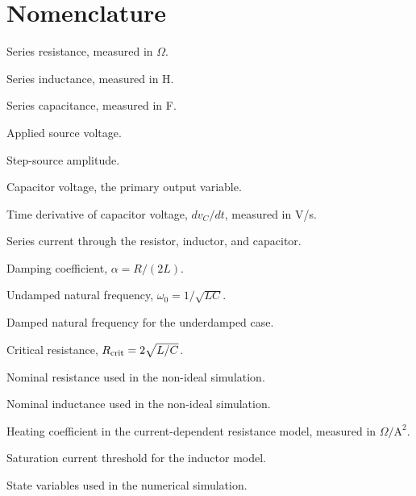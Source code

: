 \section*{Nomenclature}
\begin{IEEEdescription}[\IEEEusemathlabelsep\IEEEsetlabelwidth{$\Rcrit$}]
  \item[$R$] Series resistance, measured in $\Omega$.
  \item[$L$] Series inductance, measured in H.
  \item[$C$] Series capacitance, measured in F.
  \item[$V(t)$] Applied source voltage.
  \item[$\Vs$] Step-source amplitude.
  \item[$\vC(t)$] Capacitor voltage, the primary output variable.
  \item[$\dot{v}_C(t)$] Time derivative of capacitor voltage, $dv_C/dt$,
        measured in V/s.
  \item[$i(t)$] Series current through the resistor, inductor, and capacitor.
  \item[$\alpha$] Damping coefficient, $\alpha = R/(2L)$.
  \item[$\omega_0$] Undamped natural frequency, $\omega_0 = 1/\sqrt{LC}$.
  \item[$\omega_d$] Damped natural frequency for the underdamped case.
  \item[$\Rcrit$] Critical resistance, $R_{\mathrm{crit}} = 2\sqrt{L/C}$.
  \item[$R_0$] Nominal resistance used in the non-ideal simulation.
  \item[$L_0$] Nominal inductance used in the non-ideal simulation.
  \item[$k$] Heating coefficient in the current-dependent resistance model,
        measured in $\Omega/\mathrm{A}^2$.
  \item[$I_{\mathrm{sat}}$] Saturation current threshold for the inductor model.
  \item[$y_1,y_2$] State variables used in the numerical simulation.
\end{IEEEdescription}
